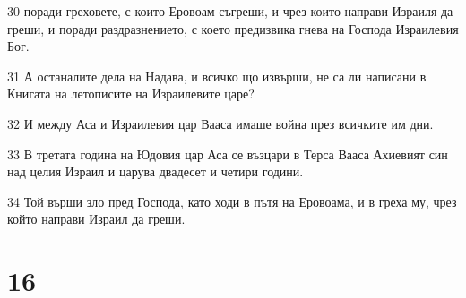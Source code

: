 \par 30 поради греховете, с които Еровоам съгреши, и чрез които направи Израиля да греши, и поради раздразнението, с което предизвика гнева на Господа Израилевия Бог.
\par 31 А останалите дела на Надава, и всичко що извърши, не са ли написани в Книгата на летописите на Израилевите царе?
\par 32 И между Аса и Израилевия цар Вааса имаше война през всичките им дни.
\par 33 В третата година на Юдовия цар Аса се възцари в Терса Вааса Ахиевият син над целия Израил и царува двадесет и четири години.
\par 34 Той върши зло пред Господа, като ходи в пътя на Еровоама, и в греха му, чрез който направи Израил да греши.

\chapter{16}

